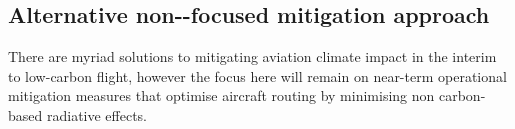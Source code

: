 


\subsection{Alternative non--focused mitigation approach}
There are myriad solutions to mitigating aviation climate impact in the interim to low-carbon flight, however the focus here will remain on near-term operational mitigation measures that optimise aircraft routing by minimising non carbon-based radiative effects. 

